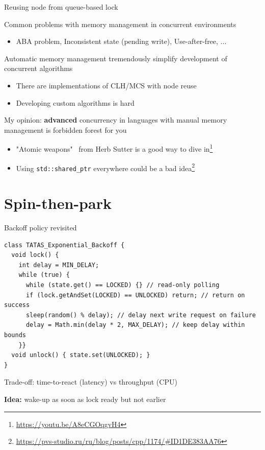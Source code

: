\begin{frame}[t,noframenumbering]{Reusing node from queue-based lock}

Common problems with memory management in concurrent environments
\begin{itemize}
  \item ABA problem, Inconsistent state (pending write), Use-after-free, ...
\end{itemize}

Automatic memory management tremendously simplify development of concurrent algorithms

\begin{itemize}
  \item There are implementations of CLH/MCS with node reuse
  \item Developing custom algorithms is hard 
\end{itemize}
\pause

My opinion: \textbf{advanced} concurrency in languages with manual memory management is forbidden forest for you
\begin{itemize}
  \pause \item "Atomic weapons" \ from Herb Sutter is a good way to dive in\footnote<3->{\tiny\url{https://youtu.be/A8eCGOqgvH4}}
  \pause \item Using \texttt{std::shared\_ptr} everywhere could be a bad idea\footnote<4->{\tiny\url{https://pvs-studio.ru/ru/blog/posts/cpp/1174/#ID1DE383AA76}}
\end{itemize}

\end{frame}


\section{Spin-then-park}
\showTOC

\begin{frame}[fragile]{Backoff policy revisited}

\begin{verbatim}
class TATAS_Exponential_Backoff {  
  void lock() {
    int delay = MIN_DELAY;
    while (true) {
      while (state.get() == LOCKED) {} // read-only polling
      if (lock.getAndSet(LOCKED) == UNLOCKED) return; // return on success
      sleep(random() % delay); // delay next write request on failure
      delay = Math.min(delay * 2, MAX_DELAY); // keep delay within bounds    
    }}
  void unlock() { state.set(UNLOCKED); }
}
\end{verbatim}

\pause 
Trade-off: time-to-react (latency) vs throughput (CPU)

\pause 
\textbf{Idea:} wake-up as soon as lock ready but not earlier

\end{frame}

